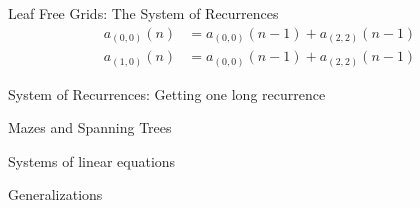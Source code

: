 \documentclass{beamer}%
\newcommand\indx[2]{\genfrac{}{}{0pt}{1}{#1}{#2}}
\newcommand\indxx[2]{(#1,#2)}
\begin{document}
\begin{frame}{Leaf Free Grids: The System of Recurrences}
  \begin{align*}
    a_{\indxx 00}(n) &= a_{\indxx 00}(n - 1) + a_{\indxx 22}(n - 1) \\
    a_{\indxx 10}(n) &= a_{\indxx 00}(n - 1) + a_{\indxx 22}(n - 1)
  \end{align*}
\end{frame}

\begin{frame}{System of Recurrences: Getting one long recurrence}
\end{frame}

\begin{frame}{Mazes and Spanning Trees}
\end{frame}

\begin{frame}{Systems of linear equations}
\end{frame}

\begin{frame}{Generalizations}
\end{frame}
\end{document}
